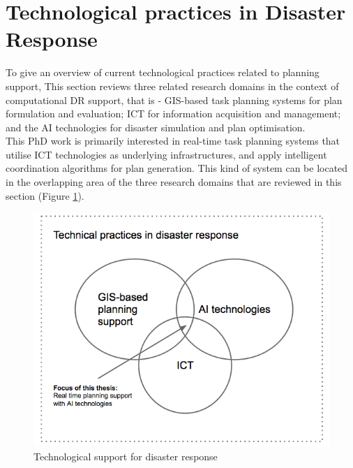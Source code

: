 \section{Technological practices in Disaster Response} \label{sec:LRApplicationAreas}
To give an overview of current technological practices related to planning support, This section reviews three related research domains in the context of computational DR support, that is - \ac{GIS}-based task planning systems for plan formulation and evaluation; \acf{ICT} for information acquisition and management; and the \acf{AI} technologies for disaster simulation and plan optimisation.  \\

This PhD work is primarily interested in real-time task planning systems that utilise \ac{ICT} technologies as underlying infrastructures, and apply intelligent coordination algorithms for plan generation. This kind of system can be located in the overlapping area of the three research domains that are  reviewed in this section (Figure \ref{fig:SystemFraming}).\\

\begin{figure}[h]
  \centering
  \includegraphics[width=1\textwidth]{img/Background/SystemFraming}
  \caption{Technological support for disaster response}
  \label{fig:SystemFraming}
\end{figure} 

